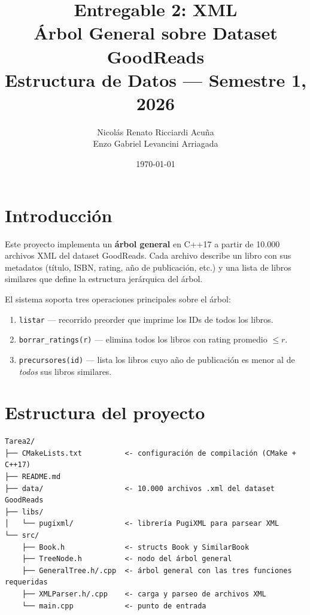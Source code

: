\documentclass[12pt, a4paper]{article}
\title{
    \vspace{2cm}
    \textbf{Entregable 2: XML} \\[0.5em]
    \large Árbol General sobre Dataset GoodReads \\[0.3em]
    \normalsize Estructura de Datos --- Semestre 1, 2026
}
\author{
    Nicolás Renato Ricciardi Acuña \\
    Enzo Gabriel Levancini Arriagada
}
\date{\today}
\begin{document}
\maketitle
\tableofcontents
\newpage

\section{Introducción}

Este proyecto implementa un \textbf{árbol general} en C++17 a partir de 10.000 archivos XML
del dataset GoodReads. Cada archivo describe un libro con sus metadatos (título, ISBN,
rating, año de publicación, etc.) y una lista de libros similares que define la estructura
jerárquica del árbol.

El sistema soporta tres operaciones principales sobre el árbol:
\begin{enumerate}
    \item \texttt{listar} — recorrido preorder que imprime los IDs de todos los libros.
    \item \texttt{borrar\_ratings(r)} — elimina todos los libros con rating promedio $\leq r$.
    \item \texttt{precursores(id)} — lista los libros cuyo año de publicación es menor
          al de \textit{todos} sus libros similares.
\end{enumerate}

\section{Estructura del proyecto}

\begin{verbatim}
Tarea2/
├── CMakeLists.txt          <- configuración de compilación (CMake + C++17)
├── README.md
├── data/                   <- 10.000 archivos .xml del dataset GoodReads
├── libs/
│   └── pugixml/            <- librería PugiXML para parsear XML
└── src/
    ├── Book.h              <- structs Book y SimilarBook
    ├── TreeNode.h          <- nodo del árbol general
    ├── GeneralTree.h/.cpp  <- árbol general con las tres funciones requeridas
    ├── XMLParser.h/.cpp    <- carga y parseo de archivos XML
    └── main.cpp            <- punto de entrada
\end{verbatim}

\end{document}
